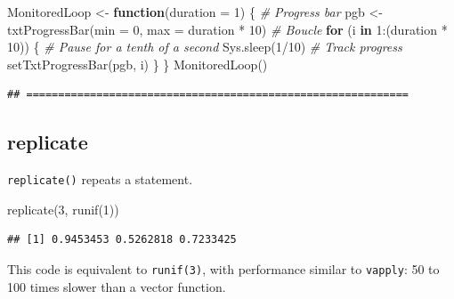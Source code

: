 \documentclass[
  12pt,
  american,
  a4paper,
  extrafontsizes,onecolumn,openright
  ]{memoir}
\newenvironment{Shaded}{\begin{snugshade}}{\end{snugshade}}
\newcommand{\AttributeTok}[1]{\textcolor[rgb]{0.77,0.63,0.00}{#1}}
\newcommand{\CommentTok}[1]{\textcolor[rgb]{0.56,0.35,0.01}{\textit{#1}}}
\newcommand{\ControlFlowTok}[1]{\textcolor[rgb]{0.13,0.29,0.53}{\textbf{#1}}}
\newcommand{\DecValTok}[1]{\textcolor[rgb]{0.00,0.00,0.81}{#1}}
\newcommand{\FunctionTok}[1]{\textcolor[rgb]{0.00,0.00,0.00}{#1}}
\newcommand{\NormalTok}[1]{#1}
\newcommand{\OtherTok}[1]{\textcolor[rgb]{0.56,0.35,0.01}{#1}}
\newcommand{\SpecialCharTok}[1]{\textcolor[rgb]{0.00,0.00,0.00}{#1}}
\newlength{\rf}
\begin{document}
\begin{Shaded}
\begin{Highlighting}[]
\NormalTok{MonitoredLoop }\OtherTok{\textless{}{-}} \ControlFlowTok{function}\NormalTok{(}\AttributeTok{duration =} \DecValTok{1}\NormalTok{) \{}
    \CommentTok{\# Progress bar}
\NormalTok{    pgb }\OtherTok{\textless{}{-}} \FunctionTok{txtProgressBar}\NormalTok{(}\AttributeTok{min =} \DecValTok{0}\NormalTok{, }\AttributeTok{max =}\NormalTok{ duration }\SpecialCharTok{*} \DecValTok{10}\NormalTok{)}
    \CommentTok{\# Boucle}
    \ControlFlowTok{for}\NormalTok{ (i }\ControlFlowTok{in} \DecValTok{1}\SpecialCharTok{:}\NormalTok{(duration }\SpecialCharTok{*} \DecValTok{10}\NormalTok{)) \{}
        \CommentTok{\# Pause for a tenth of a second}
        \FunctionTok{Sys.sleep}\NormalTok{(}\DecValTok{1}\SpecialCharTok{/}\DecValTok{10}\NormalTok{)}
        \CommentTok{\# Track progress}
        \FunctionTok{setTxtProgressBar}\NormalTok{(pgb, i)}
\NormalTok{    \}}
\NormalTok{\}}
\FunctionTok{MonitoredLoop}\NormalTok{()}
\end{Highlighting}
\end{Shaded}

\begin{verbatim}
## ============================================================
\end{verbatim}

\normalsize

\hypertarget{replicate}{%
\subsection{replicate}\label{replicate}}

\texttt{replicate()} repeats a statement.

\scriptsize

\begin{Shaded}
\begin{Highlighting}[]
\FunctionTok{replicate}\NormalTok{(}\DecValTok{3}\NormalTok{, }\FunctionTok{runif}\NormalTok{(}\DecValTok{1}\NormalTok{))}
\end{Highlighting}
\end{Shaded}

\begin{verbatim}
## [1] 0.9453453 0.5262818 0.7233425
\end{verbatim}

\normalsize

This code is equivalent to \texttt{runif(3)}, with performance similar to \texttt{vapply}: 50 to 100 times slower than a vector function.
\end{document}
